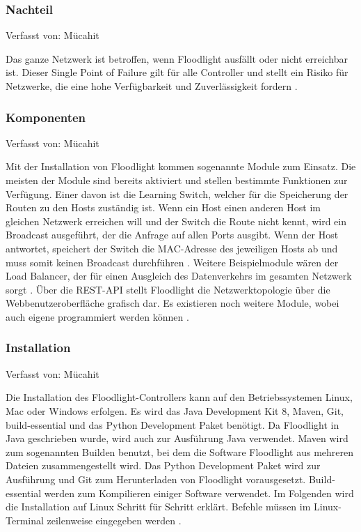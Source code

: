 \documentclass[fontsize=12pt,paper=a4,open=any,parskip=half,
  twoside=false,toc=listof,toc=bibliography,fleqn,leqno,
  captions=nooneline,captions=tableabove,british]{scrbook}
\begin{document}
\subsubsection{Nachteil}
{\tiny Verfasst von: Mücahit\par}
Das ganze Netzwerk ist betroffen, wenn Floodlight ausfällt oder nicht erreichbar ist. Dieser Single Point of Failure gilt für alle Controller und stellt ein Risiko für Netzwerke, die eine hohe Verfügbarkeit und Zuverlässigkeit fordern \cite{failure}.

\subsubsection{Komponenten}
{\tiny Verfasst von: Mücahit\par}
Mit der Installation von Floodlight kommen sogenannte Module zum Einsatz. Die meisten der Module sind bereits aktiviert und stellen bestimmte Funktionen zur Verfügung. Einer davon ist die Learning Switch, welcher für die Speicherung der Routen zu den Hosts zuständig ist. Wenn ein Host einen anderen Host im gleichen Netzwerk erreichen will und der Switch die Route nicht kennt, wird ein Broadcast ausgeführt, der die Anfrage auf allen Ports ausgibt. Wenn der Host antwortet, speichert der Switch die MAC-Adresse des jeweiligen Hosts ab und muss somit keinen Broadcast durchführen \cite{broadcast}. Weitere Beispielmodule wären der Load Balancer, der für einen Ausgleich des Datenverkehrs im gesamten Netzwerk sorgt \cite{loadbalance}. Über die REST-API stellt Floodlight die Netzwerktopologie über die Webbenutzeroberfläche grafisch dar. Es existieren noch weitere Module, wobei auch eigene programmiert werden können \cite{restapi}.

\subsubsection{Installation}
{\tiny Verfasst von: Mücahit\par}
Die Installation des Floodlight-Controllers kann auf den Betriebssystemen Linux, Mac oder Windows erfolgen. Es wird das Java Development Kit 8, Maven, Git, build-essential und das Python Development Paket benötigt. Da Floodlight in Java geschrieben wurde, wird auch zur Ausführung Java verwendet. Maven wird zum sogenannten Builden benutzt, bei dem die Software Floodlight aus mehreren Dateien zusammengestellt wird. Das Python Development Paket wird zur Ausführung und Git zum Herunterladen von Floodlight vorausgesetzt. Build-essential werden zum Kompilieren einiger Software verwendet. Im Folgenden wird die Installation auf Linux Schritt für Schritt erklärt. Befehle müssen im Linux-Terminal zeilenweise eingegeben werden \cite{install}.
\end{document}
